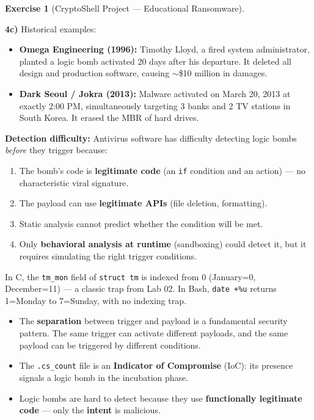 \documentclass[a4paper,11pt]{article}
\theoremstyle{plain}
\theoremstyle{definition}
\newtheorem{exercice}{Exercise}
\begin{document}
\begin{exercice}[CryptoShell Project --- Educational Ransomware]
\begin{correction}
\textbf{4c)} Historical examples:
\begin{itemize}
    \item \textbf{Omega Engineering (1996):} Timothy Lloyd, a fired system administrator, planted a logic bomb activated 20 days after his departure. It deleted all design and production software, causing $\sim$\$10 million in damages.
    \item \textbf{Dark Seoul / Jokra (2013):} Malware activated on March 20, 2013 at exactly 2:00 PM, simultaneously targeting 3 banks and 2 TV stations in South Korea. It erased the MBR of hard drives.
\end{itemize}

\textbf{Detection difficulty:} Antivirus software has difficulty detecting logic bombs \textit{before} they trigger because:
\begin{enumerate}
    \item The bomb's code is \textbf{legitimate code} (an \texttt{if} condition and an action) --- no characteristic viral signature.
    \item The payload can use \textbf{legitimate APIs} (file deletion, formatting).
    \item Static analysis cannot predict whether the condition will be met.
    \item Only \textbf{behavioral analysis at runtime} (sandboxing) could detect it, but it requires simulating the right trigger conditions.
\end{enumerate}

\begin{attention}
In C, the \texttt{tm\_mon} field of \texttt{struct tm} is indexed from 0 (January=0, December=11) --- a classic trap from Lab 02. In Bash, \texttt{date +\%u} returns 1=Monday to 7=Sunday, with no indexing trap.
\end{attention}

\begin{pointcle}
\begin{itemize}
    \item The \textbf{separation} between trigger and payload is a fundamental security pattern. The same trigger can activate different payloads, and the same payload can be triggered by different conditions.
    \item The \texttt{.cs\_count} file is an \textbf{Indicator of Compromise} (IoC): its presence signals a logic bomb in the incubation phase.
    \item Logic bombs are hard to detect because they use \textbf{functionally legitimate code} --- only the \textbf{intent} is malicious.
\end{itemize}
\end{pointcle}


\end{correction}
\end{exercice}
\end{document}
